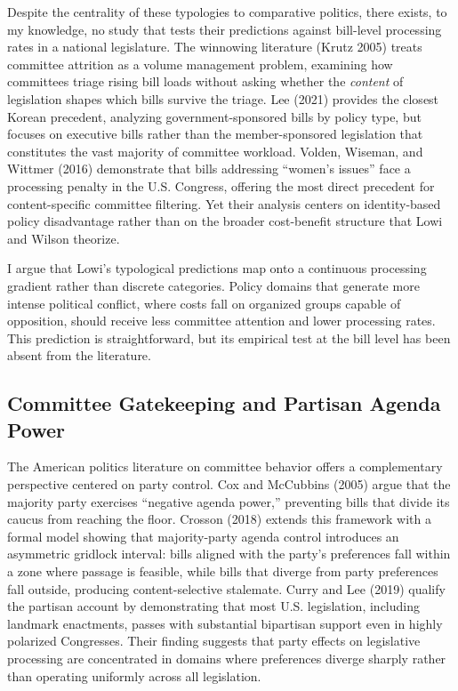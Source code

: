 \documentclass[11pt]{article}
\begin{document}
Despite the centrality of these typologies to comparative politics, there exists, to my knowledge, no study that tests their predictions against bill-level processing rates in a national legislature. The winnowing literature (Krutz 2005) treats committee attrition as a volume management problem, examining how committees triage rising bill loads without asking whether the \textit{content} of legislation shapes which bills survive the triage. Lee (2021) provides the closest Korean precedent, analyzing government-sponsored bills by policy type, but focuses on executive bills rather than the member-sponsored legislation that constitutes the vast majority of committee workload. Volden, Wiseman, and Wittmer (2016) demonstrate that bills addressing ``women's issues'' face a processing penalty in the U.S. Congress, offering the most direct precedent for content-specific committee filtering. Yet their analysis centers on identity-based policy disadvantage rather than on the broader cost-benefit structure that Lowi and Wilson theorize.

I argue that Lowi's typological predictions map onto a continuous processing gradient rather than discrete categories. Policy domains that generate more intense political conflict, where costs fall on organized groups capable of opposition, should receive less committee attention and lower processing rates. This prediction is straightforward, but its empirical test at the bill level has been absent from the literature.

\subsection{Committee Gatekeeping and Partisan Agenda Power}

The American politics literature on committee behavior offers a complementary perspective centered on party control. Cox and McCubbins (2005) argue that the majority party exercises ``negative agenda power,'' preventing bills that divide its caucus from reaching the floor. Crosson (2018) extends this framework with a formal model showing that majority-party agenda control introduces an asymmetric gridlock interval: bills aligned with the party's preferences fall within a zone where passage is feasible, while bills that diverge from party preferences fall outside, producing content-selective stalemate. Curry and Lee (2019) qualify the partisan account by demonstrating that most U.S. legislation, including landmark enactments, passes with substantial bipartisan support even in highly polarized Congresses. Their finding suggests that party effects on legislative processing are concentrated in domains where preferences diverge sharply rather than operating uniformly across all legislation.
\end{document}
